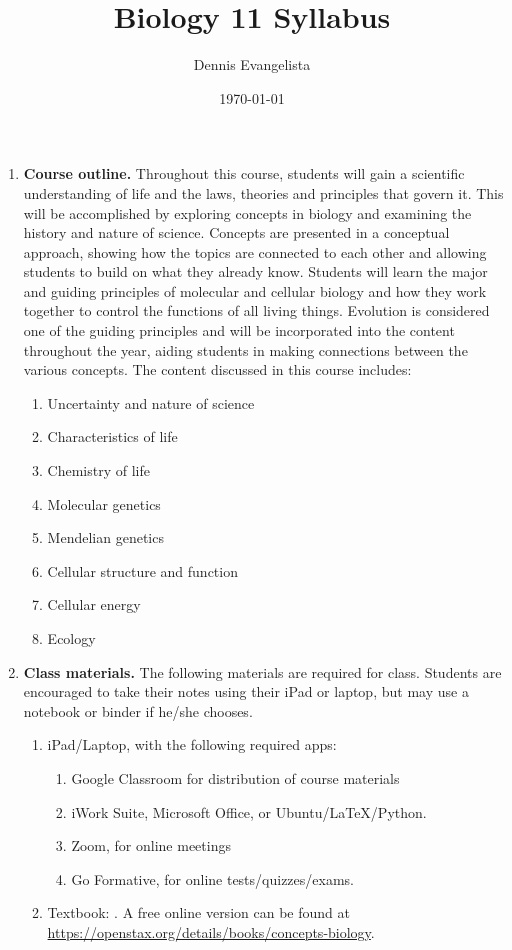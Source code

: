 \documentclass{article}
\title{Biology 11 Syllabus}
\author{Dennis Evangelista}
\date{\today}
\begin{document}

\begin{enumerate}
\item \textbf{Course outline.} Throughout this course, students will gain a scientific understanding of life and the laws, theories and principles that govern it. This will be accomplished by exploring concepts in biology and examining the history and nature of science. Concepts are presented in a conceptual approach, showing how the topics are connected to each other and allowing students to build on what they already know. Students will learn the major and guiding principles of molecular and cellular biology and how they work together to control the functions of all living things. Evolution is considered one of the guiding principles and will be incorporated into the content throughout the year, aiding students in making connections between the various concepts. The content discussed in this course includes:
\begin{enumerate}
\item Uncertainty and nature of science
\item Characteristics of life
\item Chemistry of life
\item Molecular genetics
\item Mendelian genetics
\item Cellular structure and function
\item Cellular energy
\item Ecology
\end{enumerate}

\item \textbf{Class materials.} The following materials are required for class. Students are encouraged to take their notes using their iPad or laptop, but may use a notebook or binder if he/she chooses.
\begin{enumerate}
\item iPad/Laptop, with the following required apps:
\begin{enumerate}
\item Google Classroom for distribution of course materials
\item iWork Suite, Microsoft Office, or Ubuntu/\LaTeX/Python. 
\item Zoom, for online meetings
\item Go Formative, for online tests/quizzes/exams.
\end{enumerate}
\item Textbook: . A free online version can be found at \url{https://openstax.org/details/books/concepts-biology}.
\end{enumerate}


\end{enumerate}
\end{document}
